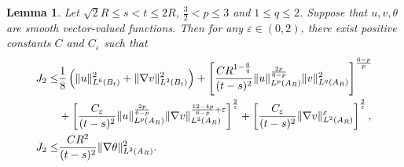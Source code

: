 \documentclass[11pt,reqno]{amsart}
\newtheorem{Lem}{Lemma}[section]
\numberwithin{Thm}{section}
\begin{document}
\begin{Lem}\label{Lem3.3}
Let $\sqrt{2}R\leq s<t\leq 2R$, $\frac{3}{2}<p\leq3$ and $1\leq q\leq2$. Suppose that $u,v,\theta$ are smooth vector-valued functions. Then for any $\varepsilon\in(0,2)$, there exist positive constants $C$ and $C_\varepsilon$ such that
\begin{align}
	J_2\leq&\frac{1}{8}\left(\|u\|_{L^6(B_t)}^2+\|\nabla v\|_{L^2(B_t)}^2\right)+\left[\frac{C R^{1-\frac{6}{q}}}{(t-s)^2}\|u\|_{L^p(A_R)}^\frac{2p}{6-p}\|v\|_{L^q(A_R)}^2\right]^\frac{6-p}{p}\notag\\
	&+\left[\frac{C_\varepsilon}{(t-s)^2}\|u\|_{L^p(A_R)}^\frac{2p}{6-p}\|\nabla v\|_{L^2(A_R)}^{\frac{12-4p}{6-p}+\varepsilon}\right]^\frac{2}{\varepsilon}+\left[\frac{C_\varepsilon}{(t-s)^2}\|\nabla v\|_{L^2(A_R)}^\varepsilon\right]^\frac{2}{\varepsilon},\label{ine3.13}\\
J_2\leq&\frac{CR^2}{(t-s)^2}\|\nabla \theta\|_{L^2(A_R)}^2.\label{ine3.14}
\end{align}

\end{Lem}
\end{document}
